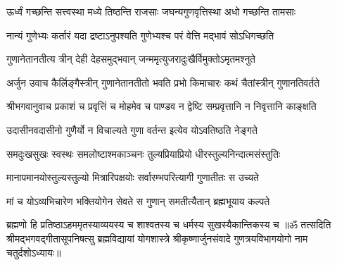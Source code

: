 \twolineshloka
{ऊर्ध्वं गच्छन्ति सत्त्वस्था मध्ये तिष्ठन्ति राजसाः}
{जघन्यगुणवृत्तिस्था अधो गच्छन्ति तामसाः}%

\twolineshloka
{नान्यं गुणेभ्यः कर्तारं यदा द्रष्टाऽनुपश्यति}
{गुणेभ्यश्च परं वेत्ति मद्भावं सोऽधिगच्छति}%

\twolineshloka
{गुणानेतानतीत्य त्रीन् देही देहसमुद्भवान्}
{जन्ममृत्युजरादुःखैर्विमुक्तोऽमृतमश्नुते}%

{अर्जुन उवाच}\nopagebreak[4]
\twolineshloka
{कैर्लिङ्गैस्त्रीन् गुणानेतानतीतो भवति प्रभो}
{किमाचारः कथं चैतांस्त्रीन् गुणानतिवर्तते}%

{श्रीभगवानुवाच}
\twolineshloka
{प्रकाशं च प्रवृत्तिं च मोहमेव च पाण्डव}
{न द्वेष्टि सम्प्रवृत्तानि न निवृत्तानि काङ्क्षति}%

\twolineshloka
{उदासीनवदासीनो गुणैर्यो न विचाल्यते}
{गुणा वर्तन्त इत्येव योऽवतिष्ठति नेङ्गते}%

\twolineshloka
{समदुःखसुखः स्वस्थः समलोष्टाश्मकाञ्चनः}
{तुल्यप्रियाप्रियो धीरस्तुल्यनिन्दात्मसंस्तुतिः}%

\twolineshloka
{मानापमानयोस्तुल्यस्तुल्यो मित्रारिपक्षयोः}
{सर्वारम्भपरित्यागी गुणातीतः स उच्यते}%

\twolineshloka
{मां च योऽव्यभिचारेण भक्तियोगेन सेवते}
{स गुणान् समतीत्यैतान् ब्रह्मभूयाय कल्पते}%

\twolineshloka
{ब्रह्मणो हि प्रतिष्ठाऽहममृतस्याव्ययस्य च}
{शाश्वतस्य च धर्मस्य सुखस्यैकान्तिकस्य च}%
{॥ॐ तत्सदिति श्रीमद्भगवद्गीतासूपनिषत्सु ब्रह्मविद्यायां योगशास्त्रे श्रीकृष्णार्जुनसंवादे गुणत्रयविभागयोगो नाम चतुर्दशोऽध्यायः॥}